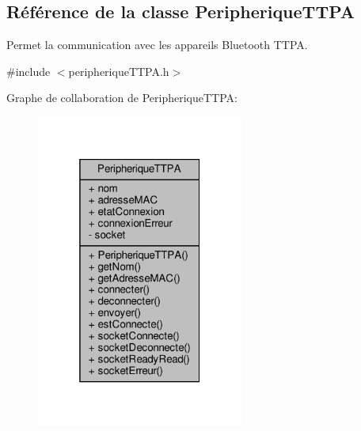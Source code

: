 \hypertarget{class_peripherique_t_t_p_a}{}\subsection{Référence de la classe Peripherique\+T\+T\+PA}
\label{class_peripherique_t_t_p_a}


Permet la communication avec les appareils Bluetooth T\+T\+PA.  




{\ttfamily \#include $<$peripherique\+T\+T\+P\+A.\+h$>$}



Graphe de collaboration de Peripherique\+T\+T\+PA\+:\nopagebreak
\begin{figure}[H]
\begin{center}
\leavevmode
\includegraphics[width=193pt]{class_peripherique_t_t_p_a__coll__graph}
\end{center}
\end{figure}
